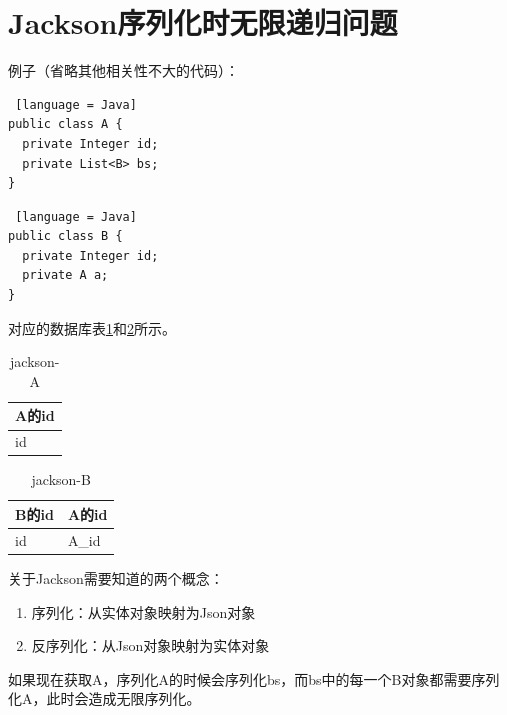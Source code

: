 \section{Jackson序列化时无限递归问题}

例子（省略其他相关性不大的代码）：

\begin{lstlisting} [language = Java]
public class A {
  private Integer id;
  private List<B> bs;
}
\end{lstlisting}

\begin{lstlisting} [language = Java]
public class B {
  private Integer id;
  private A a;
}
\end{lstlisting}

对应的数据库表\ref{jackson-A}和\ref{jackson-B}所示。

\begin{table}[htbp]
  \centering
  \song\wuhao
  \caption{jackson-A}
  \label{jackson-A}
  \begin{tabular}{l}
    \hline
    A的id \\ \hline
    id    \\ \hline
  \end{tabular}
\end{table}

\begin{table}[htbp]
  \centering
  \song\wuhao
  \caption{jackson-B}
  \label{jackson-B}
  \begin{tabular}{ll}
    \hline
    B的id & A的id \\ \hline
    id    & A\_id \\ \hline
  \end{tabular}
\end{table}

关于Jackson需要知道的两个概念：
\begin{enumerate}
  \item 序列化：从实体对象映射为Json对象
  \item 反序列化：从Json对象映射为实体对象
\end{enumerate}

如果现在获取A，序列化A的时候会序列化bs，而bs中的每一个B对象都需要序列化A，此时会造成无限序列化。

